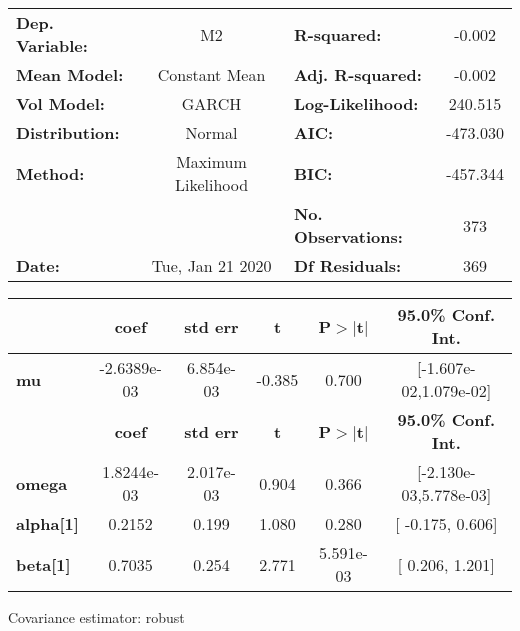 \begin{center}
\begin{tabular}{lclc}
\toprule
\textbf{Dep. Variable:} &         M2         & \textbf{  R-squared:         } &    -0.002   \\
\textbf{Mean Model:}    &   Constant Mean    & \textbf{  Adj. R-squared:    } &    -0.002   \\
\textbf{Vol Model:}     &       GARCH        & \textbf{  Log-Likelihood:    } &    240.515  \\
\textbf{Distribution:}  &       Normal       & \textbf{  AIC:               } &   -473.030  \\
\textbf{Method:}        & Maximum Likelihood & \textbf{  BIC:               } &   -457.344  \\
\textbf{}               &                    & \textbf{  No. Observations:  } &    373      \\
\textbf{Date:}          &  Tue, Jan 21 2020  & \textbf{  Df Residuals:      } &    369      \\
\bottomrule
\end{tabular}
\begin{tabular}{lccccc}
            & \textbf{coef} & \textbf{std err} & \textbf{t} & \textbf{P$>$$|$t$|$} & \textbf{95.0\% Conf. Int.}  \\
\midrule
\textbf{mu} &  -2.6389e-03  &    6.854e-03     &    -0.385  &          0.700       &   [-1.607e-02,1.079e-02]    \\
                  & \textbf{coef} & \textbf{std err} & \textbf{t} & \textbf{P$>$$|$t$|$} & \textbf{95.0\% Conf. Int.}  \\
\midrule
\textbf{omega}    &   1.8244e-03  &    2.017e-03     &     0.904  &          0.366       &   [-2.130e-03,5.778e-03]    \\
\textbf{alpha[1]} &       0.2152  &        0.199     &     1.080  &          0.280       &     [ -0.175,  0.606]       \\
\textbf{beta[1]}  &       0.7035  &        0.254     &     2.771  &      5.591e-03       &     [  0.206,  1.201]       \\
\bottomrule
\end{tabular}
\end{center}

Covariance estimator: robust